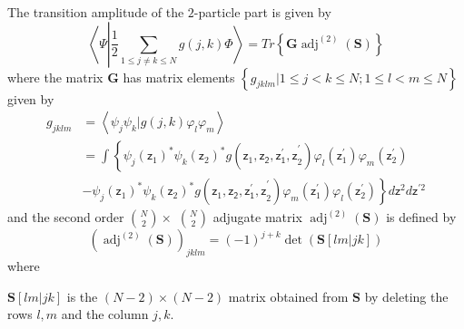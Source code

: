 \documentclass[aps,preprint]{revtex4}%
\begin{document}
The transition amplitude of the $2$-particle part is given by
\begin{equation}
\left\langle \Psi\left\vert \frac{1}{2}%
{\displaystyle\sum\limits_{1\leq j\neq k\leq N}}
g\left(  j,k\right)  \right.  \Phi\right\rangle =Tr\left\{  \mathbf{G}%
\operatorname{adj}^{\left(  2\right)  }\left(  \mathbf{S}\right)  \right\}
\end{equation}
where the matrix $\mathbf{G}$ has matrix elements $\left\{  g_{jklm}|1\leq
j<k\leq N;1\leq l<m\leq N\right\}  $ given by
\begin{align}
g_{jklm}  & =\left\langle \psi_{j}\psi_{k}|g\left(  j,k\right)  \varphi
_{l}\varphi_{m}\right\rangle \nonumber\\
& =%
{\displaystyle\int}
\left\{  \psi_{j}\left(  \mathsf{z}_{1}\right)  ^{\ast}\psi_{k}\left(
\mathsf{z}_{2}\right)  ^{\ast}g\left(  \mathsf{z}_{1}\mathsf{,\mathsf{z}%
_{2},\mathsf{z}_{1}^{\prime},z}_{2}^{\prime}\right)  \varphi_{l}\left(
\mathsf{z}_{1}^{\prime}\right)  \varphi_{m}\left(  \mathsf{z}_{2}^{\prime
}\right)  \right.  \nonumber\\
& \left.  -\psi_{j}\left(  \mathsf{z}_{1}\right)  ^{\ast}\psi_{k}\left(
\mathsf{z}_{2}\right)  ^{\ast}g\left(  \mathsf{z}_{1}\mathsf{,\mathsf{z}%
_{2},\mathsf{z}_{1}^{\prime},z}_{2}^{\prime}\right)  \varphi_{m}\left(
\mathsf{z}_{1}^{\prime}\right)  \varphi_{l}\left(  \mathsf{z}_{2}^{\prime
}\right)  \right\}  d\mathsf{z}^{2}d\mathsf{z}^{\prime2}%
\end{align}
and the second order $\binom{N}{2}\times$ $\binom{N}{2}$ adjugate matrix
$\operatorname{adj}^{\left(  2\right)  }\left(  \mathbf{S}\right)  $ is
defined by
\begin{equation}
\left(  \operatorname{adj}^{\left(  2\right)  }\left(  \mathbf{S}\right)
\right)  _{jklm}=\left(  -1\right)  ^{j+k}\det\left(  \mathbf{S}\left[
lm|jk\right]  \right)
\end{equation}
where

$\mathbf{S}\left[  lm|jk\right]  $ is the $\left(  N-2\right)  \times\left(
N-2\right)  $ matrix obtained from $\mathbf{S}$ by deleting the rows $l,m$ and
the column $j,k$.
\end{document}
